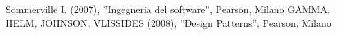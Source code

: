 \vspace*{4cm}
\begin{thebibliography}{100} 
\vspace*{1cm}
  Sommerville I. (2007), ''Ingegneria del software'', Pearson, Milano
  GAMMA, HELM, JOHNSON, VLISSIDES (2008), ''Design Patterns'', Pearson, Milano
\end{thebibliography}